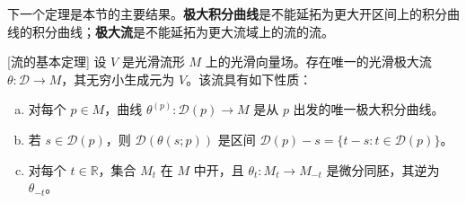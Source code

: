 \documentclass[../../main.tex]{subfiles}
\begin{document}
下一个定理是本节的主要结果。\textbf{极大积分曲线}是不能延拓为更大开区间上的积分曲线的积分曲线；\textbf{极大流}是不能延拓为更大流域上的流的流。

\begin{theorem}\label{theorem:ch09-12}[流的基本定理]
设 $V$ 是光滑流形 $M$ 上的光滑向量场。存在唯一的光滑极大流 $\theta\colon\mathscr{D}\to M$，其无穷小生成元为 $V$。该流具有如下性质：
\begin{enumerate}[(a)]
\item 对每个 $p\in M$，曲线 $\theta^{(p)}\colon\mathscr{D}(p)\to M$ 是从 $p$ 出发的唯一极大积分曲线。
\item 若 $s\in\mathscr{D}(p)$，则 $\mathscr{D}(\theta(s;p))$ 是区间 $\mathscr{D}(p)-s=\{t-s:t\in\mathscr{D}(p)\}$。
\item 对每个 $t\in\mathbb{R}$，集合 $M_t$ 在 $M$ 中开，且 $\theta_t\colon M_t\to M_{-t}$ 是微分同胚，其逆为 $\theta_{-t}$。
\end{enumerate}
\end{theorem}
\end{document}
